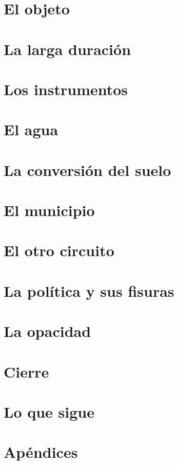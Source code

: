 \documentclass[10pt,a4paper,twoside,openright]{book}
\newcommand{\bajadatexto}{}
\newcommand{\parte}[2]{%
  \renewcommand{\bajadatexto}{#2}%
  \part{#1}%
  \renewcommand{\bajadatexto}{}}
\begin{document}

\tableofcontents
\cleardoublepage
\listoffigures
\mainmatter
\parte{El objeto}
{Qué se estudia, con qué fuentes y con qué límites. Las cuatro tesis del libro y las condiciones bajo las cuales cada una podría refutarse.}


\parte{La larga duración}
{Las fincas, sus nombres y sus dueños desde el primer número del Boletín Oficial. Un departamento que en 1908 ya litigaba por títulos que no aparecían, y lo poco que el Estado puso en él entre 1923 y 1945.}




\parte{Los instrumentos}
{Los planes y códigos con que los dos municipios ordenan su suelo: quién los escribió, qué dicen y qué parte de ellos no se publicó.}



\parte{El agua}
{Ciento dieciséis años de obras sobre el mismo cauce, un expediente de expropiación, veinticinco actos de línea de ribera y una sentencia que invierte la pregunta.}




\parte{La conversión del suelo}
{Un loteo concreto, el régimen que lo hizo posible y las condiciones que el mismo Estado supo exigirle a otros.}

\parte{El municipio}
{Doce mil habitantes, una de cada cinco viviendas sin residentes, una hacienda que no alcanza desde 1908 y las redes que no llegan a todos.}





\parte{El otro circuito}
{Cómo accede al suelo quien no puede comprarlo: sorteo, regularización, prescripción. Y cómo accede el Estado cuando el que ocupa es él.}

\parte{La política y sus fisuras}
{Los nombres que se repiten entre la propiedad y el cargo, desde 1908. Y los que reclamaron, con lo que consiguieron y lo que no.}


\parte{La opacidad}
{No falta el acto: falta el criterio. Seis instrumentos que publican la envoltura y reservan a un anexo lo que permitiría verificarlos.}

\parte{Cierre}
{Qué quedó probado, qué no, y qué falta para probarlo.}


\parte{Lo que sigue}
{Qué significa todo lo anterior, y qué podría hacerse. Los tres capítulos de esta parte son distintos de los veinticinco que los preceden: dos interpretan y el tercero propone. Van marcados como tales.}



\appendix
\parte{Apéndices}
{El aparato con el que este trabajo puede continuarse o refutarse: la cronología, los emprendimientos, la normativa, lo que falta pedir, quiénes aparecen, de qué fuentes sale cada cosa, qué habría que sancionar y cómo circuló la tierra entre 1909 y 1945.}








\backmatter
\cleardoublepage
\printindex
\end{document}
